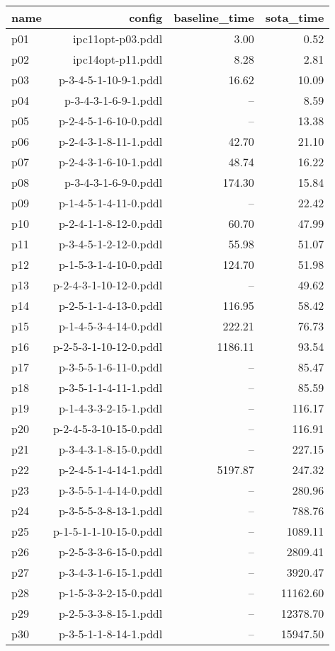 \documentclass{article}
\begin{document}
                            \begin{center}
                            \scriptsize
                            \begin{tabular}{@{}l|r|r|r@{}}
                            name & config & baseline\_time & sota\_time\\\midrule
                              p01& ipc11opt-p03.pddl&3.00&0.52\\
  p02& ipc14opt-p11.pddl&8.28&2.81\\
  p03& p-3-4-5-1-10-9-1.pddl&16.62&10.09\\
  p04& p-3-4-3-1-6-9-1.pddl&--&8.59\\
  p05& p-2-4-5-1-6-10-0.pddl&--&13.38\\
  p06& p-2-4-3-1-8-11-1.pddl&42.70&21.10\\
  p07& p-2-4-3-1-6-10-1.pddl&48.74&16.22\\
  p08& p-3-4-3-1-6-9-0.pddl&174.30&15.84\\
  p09& p-1-4-5-1-4-11-0.pddl&--&22.42\\
  p10& p-2-4-1-1-8-12-0.pddl&60.70&47.99\\
  p11& p-3-4-5-1-2-12-0.pddl&55.98&51.07\\
  p12& p-1-5-3-1-4-10-0.pddl&124.70&51.98\\
  p13& p-2-4-3-1-10-12-0.pddl&--&49.62\\
  p14& p-2-5-1-1-4-13-0.pddl&116.95&58.42\\
  p15& p-1-4-5-3-4-14-0.pddl&222.21&76.73\\
  p16& p-2-5-3-1-10-12-0.pddl&1186.11&93.54\\
  p17& p-3-5-5-1-6-11-0.pddl&--&85.47\\
  p18& p-3-5-1-1-4-11-1.pddl&--&85.59\\
  p19& p-1-4-3-3-2-15-1.pddl&--&116.17\\
  p20& p-2-4-5-3-10-15-0.pddl&--&116.91\\
  p21& p-3-4-3-1-8-15-0.pddl&--&227.15\\
  p22& p-2-4-5-1-4-14-1.pddl&5197.87&247.32\\
  p23& p-3-5-5-1-4-14-0.pddl&--&280.96\\
  p24& p-3-5-5-3-8-13-1.pddl&--&788.76\\
  p25& p-1-5-1-1-10-15-0.pddl&--&1089.11\\
  p26& p-2-5-3-3-6-15-0.pddl&--&2809.41\\
  p27& p-3-4-3-1-6-15-1.pddl&--&3920.47\\
  p28& p-1-5-3-3-2-15-0.pddl&--&11162.60\\
  p29& p-2-5-3-3-8-15-1.pddl&--&12378.70\\
  p30& p-3-5-1-1-8-14-1.pddl&--&15947.50
                            \end{tabular}
                            \end{center}
                    
                
\end{document}
